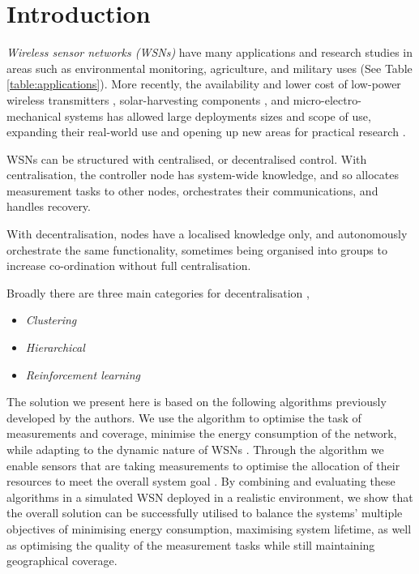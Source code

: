 \section{Introduction}

\textit{Wireless sensor networks (WSNs)} have many applications and research studies in areas such as environmental monitoring, agriculture, and military uses (See Table \ref{table:applications}). More recently, the availability and lower cost of low-power wireless transmitters \citep{902661}, solar-harvesting components \citep{Prauzek2018}, and micro-electro-mechanical systems \citep{1045391} has allowed large deployments sizes and scope of use, expanding their real-world use and opening up new areas for practical research \citep{5597912, Kandris2020}.

WSNs can be structured with centralised, or decentralised control. With centralisation, the controller node has system-wide knowledge, and so allocates measurement tasks to other nodes, orchestrates their communications, and handles recovery. 

With decentralisation, nodes have a localised knowledge only, and autonomously orchestrate the same functionality, sometimes being organised into groups to increase co-ordination without full centralisation.

Broadly there are three main categories for decentralisation \citep{10.1007/978-3-642-11814-2_4, 10.1504/IJCNDS.2012.048871},
\begin{itemize}
	\item \textit{Clustering}
	\item \textit{Hierarchical}
	\item \textit{Reinforcement learning}
\end{itemize}

The solution we present here is based on the following algorithms previously developed by the authors. We use the \acronymATARIA{}{} algorithm to optimise the task of measurements and coverage, minimise the energy consumption of the network, while adapting to the dynamic nature of WSNs \citep{creech2021dynamic}. Through the \acronymMGRAO{}{} algorithm we enable sensors that are taking measurements to optimise the allocation of their resources to meet the overall system goal \citep{creech2021resource}. By combining and evaluating these algorithms in a simulated WSN deployed in a realistic environment, we show that the overall solution can be successfully utilised to balance the systems' multiple objectives of minimising energy consumption, maximising system lifetime, as well as optimising the quality of the measurement tasks while still maintaining geographical coverage.

